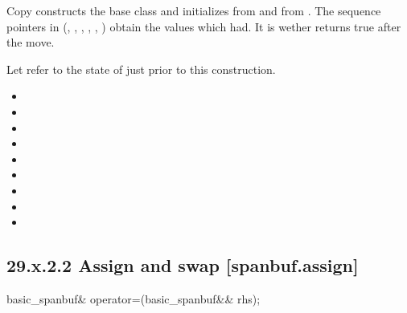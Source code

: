 \documentclass[ebook,11pt,article]{memoir}
\begin{document}
\begin{itemdescr}
\pnum
\effects 
Copy constructs the base class 
and initializes  from  and  from .
The sequence pointers in 
(, , ,
, , ) obtain
the values which  had.
It is 
wether  returns true after the move.


\pnum
\postconditions Let  refer to the state of
 just prior to this construction.

\begin{itemize}
\item {}
\item {}
\item {}
\item {}
\item {}
\item {}
\item {}
\item {}
\item {}
\end{itemize}
\end{itemdescr}


\subsection{29.x.2.2 Assign and swap [spanbuf.assign]}

\begin{itemdecl}
basic_spanbuf& operator=(basic_spanbuf&& rhs);
\end{itemdecl}
\end{document}
